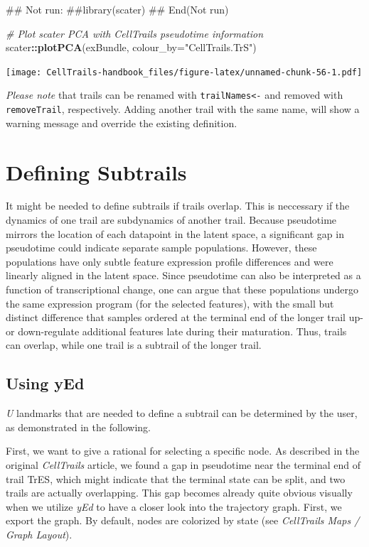 \documentclass[]{book}
\newenvironment{Shaded}{\begin{snugshade}}{\end{snugshade}}
\newcommand{\KeywordTok}[1]{\textcolor[rgb]{0.13,0.29,0.53}{\textbf{#1}}}
\newcommand{\DataTypeTok}[1]{\textcolor[rgb]{0.13,0.29,0.53}{#1}}
\newcommand{\StringTok}[1]{\textcolor[rgb]{0.31,0.60,0.02}{#1}}
\newcommand{\CommentTok}[1]{\textcolor[rgb]{0.56,0.35,0.01}{\textit{#1}}}
\newcommand{\OperatorTok}[1]{\textcolor[rgb]{0.81,0.36,0.00}{\textbf{#1}}}
\newcommand{\NormalTok}[1]{#1}
\theoremstyle{definition}
\theoremstyle{definition}
\theoremstyle{definition}
\theoremstyle{remark}
\begin{document}
\begin{Shaded}
\begin{Highlighting}[]
\NormalTok{## Not run: }
\NormalTok{##library(scater)}
\NormalTok{## End(Not run)}

\CommentTok{# Plot scater PCA with CellTrails pseudotime information}
\NormalTok{scater}\OperatorTok{::}\KeywordTok{plotPCA}\NormalTok{(exBundle, }\DataTypeTok{colour_by=}\StringTok{"CellTrails.TrS"}\NormalTok{)}
\end{Highlighting}
\end{Shaded}

\texttt{[image: CellTrails-handbook\_files/figure-latex/unnamed-chunk-56-1.pdf]}

\emph{Please note} that trails can be renamed with
\texttt{trailNames\textless{}-} and removed with \texttt{removeTrail},
respectively. Adding another trail with the same name, will show a
warning message and override the existing definition.

\section{Defining Subtrails}\label{defining-subtrails}

It might be needed to define subtrails if trails overlap. This is
neccessary if the dynamics of one trail are subdynamics of another
trail. Because pseudotime mirrors the location of each datapoint in the
latent space, a significant gap in pseudotime could indicate separate
sample populations. However, these populations have only subtle feature
expression profile differences and were linearly aligned in the latent
space. Since pseudotime can also be interpreted as a function of
transcriptional change, one can argue that these populations undergo the
same expression program (for the selected features), with the small but
distinct difference that samples ordered at the terminal end of the
longer trail up- or down-regulate additional features late during their
maturation. Thus, trails can overlap, while one trail is a subtrail of
the longer trail.

\subsection{Using yEd}\label{using-yed}

\emph{U} landmarks that are needed to define a subtrail can be
determined by the user, as demonstrated in the following.

First, we want to give a rational for selecting a specific node. As
described in the original \emph{CellTrails} article, we found a gap in
pseudotime near the terminal end of trail TrES, which might indicate
that the terminal state can be split, and two trails are actually
overlapping. This gap becomes already quite obvious visually when we
utilize \emph{yEd} to have a closer look into the trajectory graph.
First, we export the graph. By default, nodes are colorized by state
(see \emph{CellTrails Maps / Graph Layout}).
\end{document}
